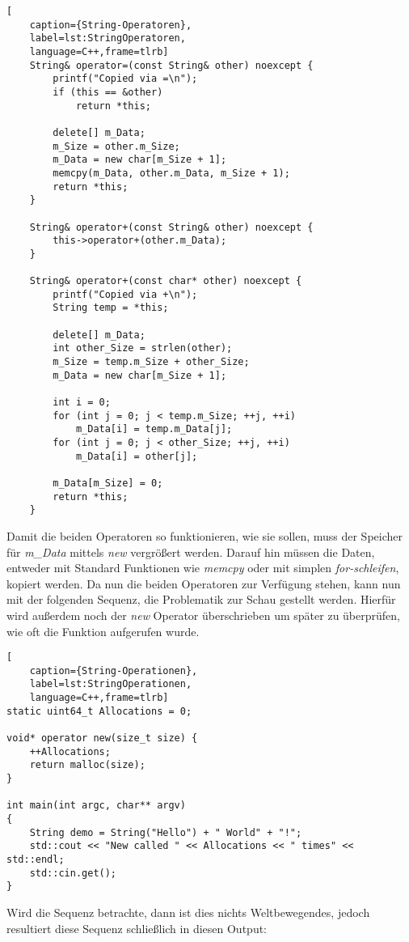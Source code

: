 \begin{lstlisting}[
    caption={String-Operatoren},
    label=lst:StringOperatoren,
    language=C++,frame=tlrb]
	String& operator=(const String& other) noexcept {
		printf("Copied via =\n");
		if (this == &other)
			return *this;

		delete[] m_Data;
		m_Size = other.m_Size;
		m_Data = new char[m_Size + 1];
		memcpy(m_Data, other.m_Data, m_Size + 1);
		return *this;
	}

	String& operator+(const String& other) noexcept {
		this->operator+(other.m_Data);
	}

	String& operator+(const char* other) noexcept {
		printf("Copied via +\n");
		String temp = *this;

		delete[] m_Data;
		int other_Size = strlen(other);
		m_Size = temp.m_Size + other_Size;
		m_Data = new char[m_Size + 1];

		int i = 0;
		for (int j = 0; j < temp.m_Size; ++j, ++i)
			m_Data[i] = temp.m_Data[j];
		for (int j = 0; j < other_Size; ++j, ++i)
			m_Data[i] = other[j];

		m_Data[m_Size] = 0;
		return *this;
	}
\end{lstlisting}

Damit die beiden Operatoren so funktionieren, wie sie sollen, muss der Speicher für \emph{m\_Data}
mittels \emph{new} vergrößert werden. Darauf hin müssen die Daten, entweder mit Standard Funktionen
wie \emph{memcpy} oder mit simplen \emph{for-schleifen}, kopiert werden.
\newline
\newline
Da nun die beiden Operatoren zur Verfügung stehen, kann nun mit der folgenden Sequenz, die
Problematik zur Schau gestellt werden. Hierfür wird außerdem noch der \emph{new} Operator
überschrieben um später zu überprüfen, wie oft die Funktion aufgerufen wurde.

\begin{lstlisting}[
    caption={String-Operationen},
    label=lst:StringOperationen,
    language=C++,frame=tlrb]
static uint64_t Allocations = 0;

void* operator new(size_t size) {
	++Allocations;
	return malloc(size);
}

int main(int argc, char** argv)
{
	String demo = String("Hello") + " World" + "!";
	std::cout << "New called " << Allocations << " times" << std::endl;
	std::cin.get();
}
\end{lstlisting}
Wird die Sequenz betrachte, dann ist dies nichts Weltbewegendes, jedoch resultiert diese Sequenz
schließlich in diesen Output:

